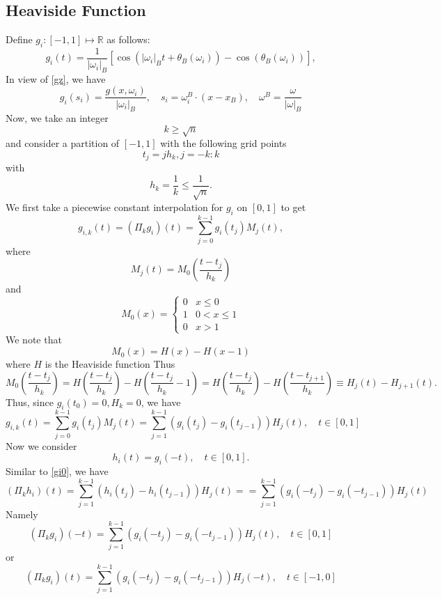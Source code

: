 \subsection{Heaviside Function}
Define $g_i: [-1,1]\mapsto \mathbb R$ as
follows:
\begin{equation}
  \label{psi}
g_i(t)=\frac{1}{|\omega_i|_B}[\cos(|\omega_i|_Bt+\theta_B(\omega_i))  -\cos(\theta_B(\omega_i))],
\end{equation}
In view of \eqref{gz}, we have
\begin{equation}
  \label{gpsi}
g_i(s_i)=\frac{g(x,\omega_i)}{|\omega_i|_B}, \quad s_i=\omega_i^B\cdot(x-x_B),\quad \omega^B=\frac{\omega}{|\omega|_B}
\end{equation}
Now, we take an integer
\begin{equation}
  \label{k}
k\ge \sqrt{n}  
\end{equation}
and consider a partition of $[-1,1]$ with the following grid points
$$
t_j=jh_k, j=-k:k
$$
with 
$$
 h_k=\frac{1}{k}\le \frac{1}{\sqrt{n}}.
$$
We first take a piecewise constant interpolation for $g_i$ on $[0,1]$ to get
$$
g_{i,k}(t)=(\Pi_kg_i)(t)=\sum_{j=0}^{k-1}g_i(t_j) M_j(t),   
$$
where
$$
M_j(t)=M_0(\frac{t-t_j}{h_k})
$$
and
\begin{equation}
  \label{cardinal}
M_0(x)=
\left\{
  \begin{array}{ll}
0 & x\le0 \\
1 & 0< x\le1    \\
0 & x > 1    
  \end{array}
\right.
\end{equation}
We note that
$$
M_0(x)=H(x)-H(x-1)
$$
where $H$ is the Heaviside function
Thus
$$
M_0(\frac{t-t_{j}}{h_k})
=H(\frac{t-t_{j}}{h_k})-H(\frac{t-t_{j}}{h_k}-1)=H(\frac{t-t_{j}}{h_k})-H(\frac{t-t_{j+1}}{h_k})
\equiv H_{j}(t)-H_{j+1}(t).
$$
Thus, since $g_i(t_0)=0, H_k=0$, we have
\begin{equation}  \label{gi0}
g_{i,k}(t)=\sum_{j=0}^{k-1}g_i(t_j) M_j(t)
=\sum_{j=1}^{k-1}(g_i(t_j) - g_i(t_{j-1})) H_{j}(t), \quad t\in [0,1]
\end{equation}
Now we consider
\begin{equation}
h_i(t) = g_i(-t), \quad t\in [0,1].
\end{equation}
Similar to \eqref{gi0}, we have
$$
(\Pi_kh_i)(t)=\sum_{j=1}^{k-1}(h_i(t_j) - h_i(t_{j-1}))H_j(t)=
=\sum_{j=1}^{k-1}(g_i(-t_j) - g_i(-t_{j-1}))H_j(t)
$$
Namely
$$
(\Pi_k g_i)(-t)=\sum_{j=1}^{k-1}(g_i(-t_j) - g_i(-t_{j-1}))H_j(t), \quad t\in [0,1]
$$
or
\begin{equation}\label{gi1}
(\Pi_k g_i)(t)=\sum_{j=1}^{k-1}(g_i(-t_j) - g_i(-t_{j-1}))H_j(-t), \quad t\in [-1,0]
\end{equation}
